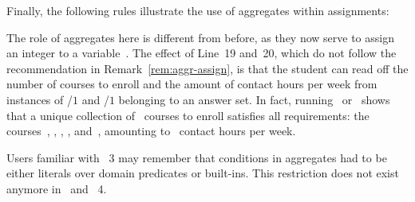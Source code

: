\begin{example}
Finally, the following rules illustrate the use of aggregates within assignments:
%

%
The role of aggregates here is different from before,
as they now serve to assign an integer to a variable~.
The effect of Line~19 and~20,
which do not follow the recommendation in Remark~\ref{rem:aggr-assign},
is that the student can read off the number of
courses to enroll and the amount of contact hours per week from instances of
/$1$ and /$1$ belonging to an answer set.%
%
In fact, running \clingo\ or \clasp\ shows
that a unique collection of~ courses to enroll satisfies all requirements:
the courses~, , , , and~,
amounting to~ contact hours per week.
%
\end{example}

\begin{note}
Users familiar with \gringo~3 may remember that conditions in aggregates
had to be either literals over domain predicates or built-ins.
This restriction does not exist anymore in \gringo\ and \clingo~4.
\end{note}

